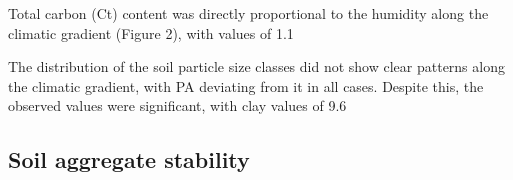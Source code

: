 Total carbon (Ct) content was directly proportional to the humidity along the climatic gradient (Figure 2), with values of 1.1%

The distribution of the soil particle size classes did not show clear patterns along the climatic gradient, with PA deviating from it in all cases. Despite this, the observed values were significant, with clay values of 9.6%

\subsection{Soil aggregate stability}

